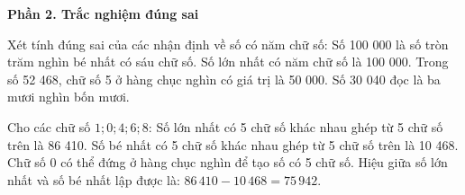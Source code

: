 \textbf{Phần 2. Trắc nghiệm đúng sai}

\begin{ex} %
Xét tính đúng sai của các nhận định về số có năm chữ số:
\choiceTF
{\True Số 100 000 là số tròn trăm nghìn bé nhất có sáu chữ số.}
{Số lớn nhất có năm chữ số là 100 000.}
{\True Trong số 52 468, chữ số 5 ở hàng chục nghìn có giá trị là 50 000.}
{Số 30 040 đọc là ba mươi nghìn bốn mươi.}
\end{ex}

\begin{ex} %
Cho các chữ số $1; 0; 4; 6; 8$:
\choiceTF
{\True Số lớn nhất có 5 chữ số khác nhau ghép từ 5 chữ số trên là 86 410.}
{\True Số bé nhất có 5 chữ số khác nhau ghép từ 5 chữ số trên là 10 468.}
{Chữ số 0 có thể đứng ở hàng chục nghìn để tạo số có 5 chữ số.}
{\True Hiệu giữa số lớn nhất và số bé nhất lập được là: $86\,410 - 10\,468 = 75\,942$.}
\end{ex}

